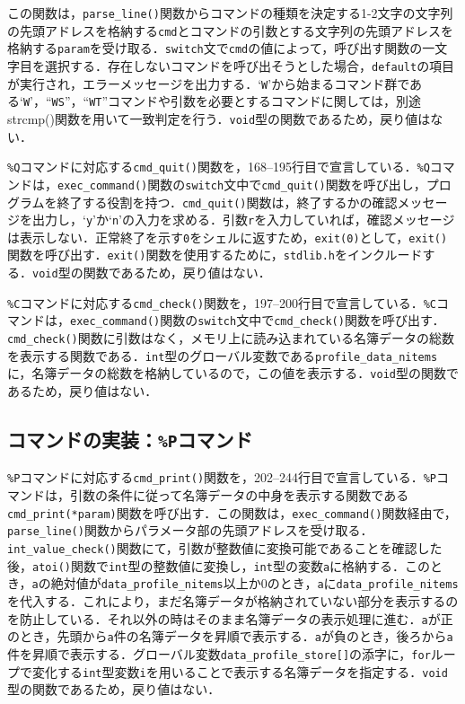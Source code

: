 この関数は，\verb|parse_line()|関数からコマンドの種類を決定する1-2文字の文字列の先頭アドレスを格納する\verb|cmd|とコマンドの引数とする文字列の先頭アドレスを格納する\verb|param|を受け取る．\verb|switch|文で\verb|cmd|の値によって，呼び出す関数の一文字目を選択する．存在しないコマンドを呼び出そうとした場合，\verb|default|の項目が実行され，エラーメッセージを出力する．‘\verb|W|’から始まるコマンド群である‘\verb|W|’，“\verb|WS|”，“\verb|WT|”コマンドや引数を必要とするコマンドに関しては，別途strcmp()関数を用いて一致判定を行う．\verb|void|型の関数であるため，戻り値はない．

\verb|%Q|コマンドに対応する\verb|cmd_quit()|関数を，168--195行目で宣言している．\verb|%Q|コマンドは，\verb|exec_command()|関数の\verb|switch|文中で\verb|cmd_quit()|関数を呼び出し，プログラムを終了する役割を持つ．\verb|cmd_quit()|関数は，終了するかの確認メッセージを出力し，‘\verb|y|’か‘\verb|n|’の入力を求める．引数\verb|r|を入力していれば，確認メッセージは表示しない．正常終了を示す\verb|0|をシェルに返すため，\verb|exit(0)|として，\verb|exit()|関数を呼び出す．\verb|exit()|関数を使用するために，\verb|stdlib.h|をインクルードする．\verb|void|型の関数であるため，戻り値はない．

\verb|%C|コマンドに対応する\verb|cmd_check()|関数を，197--200行目で宣言している．\verb|%C|コマンドは，\verb|exec_command()|関数の\verb|switch|文中で\verb|cmd_check()|関数を呼び出す．\verb|cmd_check()|関数に引数はなく，メモリ上に読み込まれている名簿データの総数を表示する関数である．\verb|int|型のグローバル変数である\verb|profile_data_nitems|に，名簿データの総数を格納しているので，この値を表示する．\verb|void|型の関数であるため，戻り値はない．

\subsection{コマンドの実装：\texttt{\%P}コマンド}

\verb|%P|コマンドに対応する\verb|cmd_print()|関数を，202--244行目で宣言している．\verb|%P|コマンドは，引数の条件に従って名簿データの中身を表示する関数である\verb|cmd_print(*param)|関数を呼び出す．この関数は，\verb|exec_command()|関数経由で，\verb|parse_line()|関数からパラメータ部の先頭アドレスを受け取る．\verb|int_value_check()|関数にて，引数が整数値に変換可能であることを確認した後，\verb|atoi()|関数で\verb|int|型の整数値に変換し，\verb|int|型の変数\verb|a|に格納する．このとき，\verb|a|の絶対値が\verb|data_profile_nitems|以上か$0$のとき，\verb|a|に\verb|data_profile_nitems|を代入する．これにより，まだ名簿データが格納されていない部分を表示するのを防止している．それ以外の時はそのまま名簿データの表示処理に進む．\verb|a|が正のとき，先頭から\verb|a|件の名簿データを昇順で表示する．\verb|a|が負のとき，後ろから\verb|a|件を昇順で表示する．グローバル変数\verb|data_profile_store[]|の添字に，\verb|for|ループで変化する\verb|int|型変数\verb|i|を用いることで表示する名簿データを指定する．\verb|void|型の関数であるため，戻り値はない．

